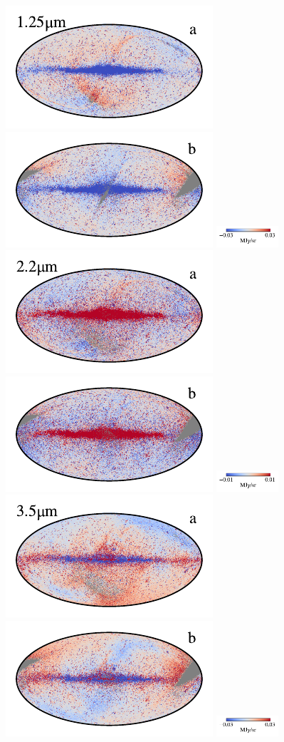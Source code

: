 \documentclass[twocolumn]{aa}
\begin{document}
\begin{figure}[t]
    \centering
    \includegraphics[width=0.22\linewidth]{figs/compare_zodi_res/cosmoglobe_res_01a.pdf}%
    \includegraphics[width=0.22\linewidth]{figs/compare_zodi_res/cosmoglobe_res_01b.pdf}%
    \includegraphics[width=23mm,angle=90]{figs/compare_zodi_res/cbar_01.pdf}\hspace*{3mm}
    \includegraphics[width=0.22\linewidth]{figs/compare_zodi_res/cosmoglobe_res_02a.pdf}%
    \includegraphics[width=0.22\linewidth]{figs/compare_zodi_res/cosmoglobe_res_02b.pdf}%
    \includegraphics[width=23mm,angle=90]{figs/compare_zodi_res/cbar_02.pdf}\\
    \includegraphics[width=0.22\linewidth]{figs/compare_zodi_res/cosmoglobe_res_03a.pdf}%
    \includegraphics[width=0.22\linewidth]{figs/compare_zodi_res/cosmoglobe_res_03b.pdf}%
    \includegraphics[width=23mm,angle=90]{figs/compare_zodi_res/cbar_03.pdf}\hspace*{3mm}

\end{figure}
\end{document}
